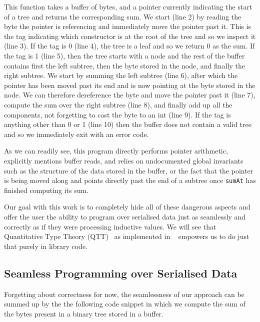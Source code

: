 This function takes a buffer of bytes, and
a pointer currently indicating the start of a tree
and returns the corresponding sum.
%
We start (line 2) by reading the byte the pointer is referencing and
immediately move the pointer past it.
%
This is the tag indicating which constructor is at the root of the tree
and so we inspect it (line 3).
%
If the tag is 0 (line 4), the tree is a leaf and so we return $0$ as the sum.
%
If the tag is 1 (line 5), then the tree starts with a node and the rest
of the buffer contains
first the left subtree,
then the byte stored in the node,
and finally the right subtree.
%
We start by summing the left subtree (line 6),
after which the pointer has been moved past its end and is now pointing
at the byte stored in the node.
We can therefore dereference the byte and move the pointer past it (line 7),
compute the sum over the right subtree (line 8),
and finally add up all the components, not forgetting to cast the byte to an int (line 9).
%
If the tag is anything other than 0 or 1 (line 10) then the buffer does not
contain a valid tree and so we immediately exit with an error code.

As we can readily see, this program
directly performs pointer arithmetic,
explicitly mentions buffer reads,
and relies on undocumented global invariants
such as the structure of the data stored in the buffer,
or the fact that the pointer is being moved along and points directly past
the end of a subtree once \texttt{sumAt} has finished computing
its sum.

Our goal with this work is to completely hide all of these
dangerous aspects
and offer the user the ability to program over serialised data
just as seamlessly and correctly as
if they were processing inductive values.
%
We will see that
Quantitative Type Theory (QTT)~\citep{DBLP:conf/birthday/McBride16, DBLP:conf/lics/Atkey18}
as implemented in \idris{}~\citep{DBLP:conf/ecoop/Brady21}
empowers us to do just that purely in library code.

\subsection{Seamless Programming over Serialised Data}\label{sec:seamless}

Forgetting about correctness for now, the seamlessness of
our approach can be summed up by the
the following code snippet
in which we compute the sum of the bytes
present in a binary tree stored in a buffer.


